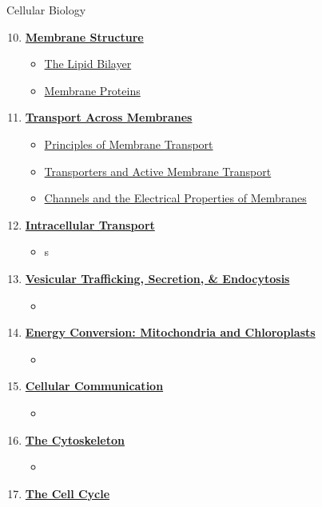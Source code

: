 \documentclass[12pt,letterpaper]{article}
\begin{document}
\begin{contbox}{Cellular Biology}{ 
\begin{enumerate}[font=\bfseries, wide]
    \setcounter{enumi}{9}
    \item \hyperlink{10}{\textbf{Membrane Structure}}
    \begin{itemize}
        \item \hyperlink{10.1a}{The Lipid Bilayer}
        \item \hyperlink{10.2a}{Membrane Proteins}
    \end{itemize}
    \item \hyperlink{11}{\textbf{Transport Across Membranes}}
    \begin{itemize}
        \item \hyperlink{11.1}{Principles of Membrane Transport}
        \item \hyperlink{11.2}{Transporters and Active Membrane Transport}
        \item \hyperlink{11.3}{Channels and the Electrical Properties of Membranes}
    \end{itemize}
    \item \hyperlink{12}{\textbf{Intracellular Transport}}
    \begin{itemize}
        \item s
    \end{itemize}
    \item \hyperlink{13}{\textbf{Vesicular Trafficking, Secretion, \& Endocytosis}}
    \begin{itemize}
        \item
    \end{itemize}
    \item \hyperlink{14}{\textbf{Energy Conversion: Mitochondria and Chloroplasts}}
    \begin{itemize}
        \item 
    \end{itemize}
    \item \hyperlink{15}{\textbf{Cellular Communication}}
    \begin{itemize}
        \item 
    \end{itemize}
    \item \hyperlink{16}{\textbf{The Cytoskeleton}}
    \begin{itemize}
        \item 
    \end{itemize}
    \item \hyperlink{17}{\textbf{The Cell Cycle}}

\end{enumerate}}
\end{contbox}
\end{document}
